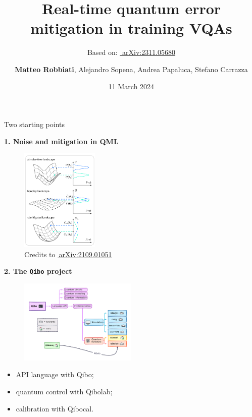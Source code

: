 \documentclass[8pt, xcolor={svgnames}, hyperref={linkcolor=black}, aspectratio=169]{beamer}
\title{Real-time quantum error mitigation in training VQAs}
\date{11 March 2024}
\author[\textbf{Matteo Robbiati}, Alejandro Sopena, Andrea Papaluca, Stefano Carrazza]{\textbf{Matteo Robbiati}, Alejandro Sopena, Andrea Papaluca, Stefano Carrazza}
\subtitle{Based on: \href{https://arxiv.org/abs/2311.05680}{\faBook\,\,arXiv:2311.05680}}
\begin{document}
\maketitle


\begin{frame}{Two starting points}
\pause
\begin{multicols}{2}
\textbf{1. Noise and mitigation in QML}
\vspace{-0.1cm}
\begin{figure}
\includegraphics[width=0.33\textwidth, height=0.72\textheight]{figures/NIBP_cropped.pdf}
\caption*{Credits to \href{https://arxiv.org/abs/2109.01051}{\faBook\,arXiv:2109.01051}}
\end{figure}
\vspace{0.1cm}

\pause
\textbf{2. The \texttt{Qibo} project}
\vspace{-0.6cm}
\begin{figure}
\includegraphics[width=0.5\textwidth, height=0.58\textheight]{figures/compact_ecosystem.pdf}
\end{figure}
\vspace{-0.4cm}
\begin{tcolorbox}[colback=red!15, title= Full-stack framework]
\small
\begin{itemize}[noitemsep]
\item[\faCode] API language with Qibo;
\item[\faCog] quantum control with Qibolab;
\item[\faCrosshairs] calibration with Qibocal.
\end{itemize}
\end{tcolorbox}
\end{multicols}
\end{frame}
\end{document}
